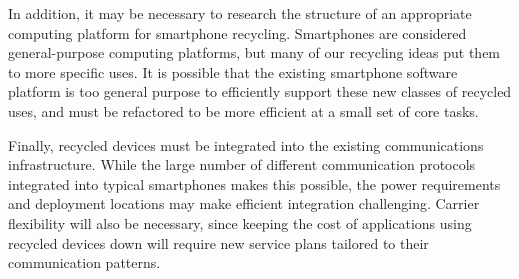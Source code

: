 In addition, it may be necessary to research the structure of an appropriate
computing platform for smartphone recycling. Smartphones are considered
general-purpose computing platforms, but many of our recycling ideas put them
to more specific uses. It is possible that the existing smartphone software
platform is too general purpose to efficiently support these new classes of
recycled uses, and must be refactored to be more efficient at a small set of
core tasks.

Finally, recycled devices must be integrated into the existing communications
infrastructure. While the large number of different communication protocols
integrated into typical smartphones makes this possible, the power
requirements and deployment locations may make efficient integration
challenging. Carrier flexibility will also be necessary, since keeping the
cost of applications using recycled devices down will require new service
plans tailored to their communication patterns.
